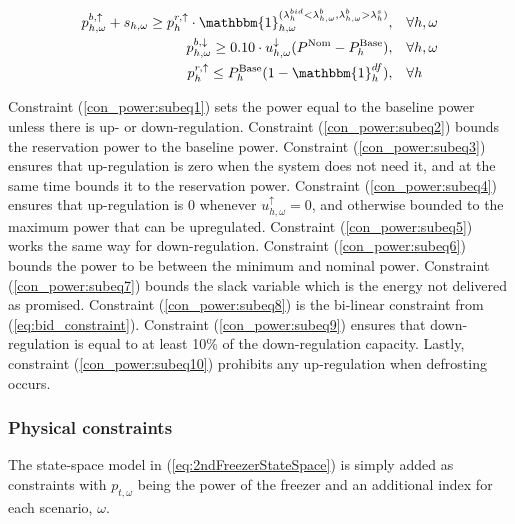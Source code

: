 \begin{subequations}
\begin{align}
        p^{b, \uparrow}_{h,\omega} + s_{h,\omega} \geq p^{r,\uparrow}_{h} \cdot \mathbbm{1}_{h,\omega}^{(\lambda^{bid}_{h} < \lambda^{b}_{h,\omega}, \lambda^{b}_{h,\omega} > \lambda^{s}_{h})}, \quad & \forall{h,\omega} \label{con_power:subeq8}                                                                              \\
        p^{b, \downarrow}_{h,\omega} \geq 0.10 \cdot u^{\downarrow}_{h,\omega} (P^{\text{Nom}} - P^{\text{Base}}_{h}), \quad                                                                           & \forall{h,\omega}                                                                             \label{con_power:subeq9}  \\
        p^{r, \uparrow}_{h} \leq P^{\text{Base}}_{h} (1 - \mathbbm{1}_{h}^{df}), \quad                                                                                                                 & \forall{h} \label{con_power:subeq10}
    \end{align}
\end{subequations}

Constraint (\ref{con_power:subeq1}) sets the power equal to the baseline power unless there is up- or down-regulation. Constraint (\ref{con_power:subeq2}) bounds the reservation power to the baseline power. Constraint (\ref{con_power:subeq3}) ensures that up-regulation is zero when the system does not need it, and at the same time bounds it to the reservation power. Constraint (\ref{con_power:subeq4}) ensures that up-regulation is 0 whenever $u^{\uparrow}_{h,\omega} = 0$, and otherwise bounded to the maximum power that can be upregulated. Constraint (\ref{con_power:subeq5}) works the same way for down-regulation. Constraint (\ref{con_power:subeq6}) bounds the power to be between the minimum and nominal power. Constraint (\ref{con_power:subeq7}) bounds the slack variable which is the energy not delivered as promised. Constraint (\ref{con_power:subeq8}) is the bi-linear constraint from (\ref{eq:bid_constraint}). Constraint (\ref{con_power:subeq9}) ensures that down-regulation is equal to at least 10\% of the down-regulation capacity. Lastly, constraint (\ref{con_power:subeq10}) prohibits any up-regulation when defrosting occurs.

\subsubsection{Physical constraints}\label{sec:temperature_constraints}

The state-space model in (\ref{eq:2ndFreezerStateSpace}) is simply added as constraints with $p_{t,\omega}$ being the power of the freezer and an additional index for each scenario, $\omega$.


